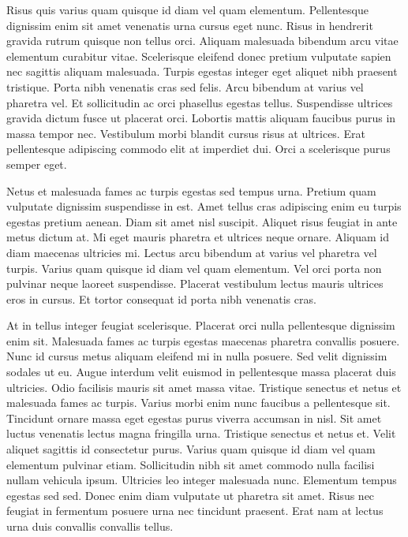 \documentclass[11pt,a4paper]{article}
\begin{document}
Risus quis varius quam quisque id diam vel quam elementum. Pellentesque dignissim enim sit amet venenatis urna cursus eget nunc. Risus in hendrerit gravida rutrum quisque non tellus orci. Aliquam malesuada bibendum arcu vitae elementum curabitur vitae. Scelerisque eleifend donec pretium vulputate sapien nec sagittis aliquam malesuada. Turpis egestas integer eget aliquet nibh praesent tristique. Porta nibh venenatis cras sed felis. Arcu bibendum at varius vel pharetra vel. Et sollicitudin ac orci phasellus egestas tellus. Suspendisse ultrices gravida dictum fusce ut placerat orci. Lobortis mattis aliquam faucibus purus in massa tempor nec. Vestibulum morbi blandit cursus risus at ultrices. Erat pellentesque adipiscing commodo elit at imperdiet dui. Orci a scelerisque purus semper eget.

Netus et malesuada fames ac turpis egestas sed tempus urna. Pretium quam vulputate dignissim suspendisse in est. Amet tellus cras adipiscing enim eu turpis egestas pretium aenean. Diam sit amet nisl suscipit. Aliquet risus feugiat in ante metus dictum at. Mi eget mauris pharetra et ultrices neque ornare. Aliquam id diam maecenas ultricies mi. Lectus arcu bibendum at varius vel pharetra vel turpis. Varius quam quisque id diam vel quam elementum. Vel orci porta non pulvinar neque laoreet suspendisse. Placerat vestibulum lectus mauris ultrices eros in cursus. Et tortor consequat id porta nibh venenatis cras.

At in tellus integer feugiat scelerisque. Placerat orci nulla pellentesque dignissim enim sit. Malesuada fames ac turpis egestas maecenas pharetra convallis posuere. Nunc id cursus metus aliquam eleifend mi in nulla posuere. Sed velit dignissim sodales ut eu. Augue interdum velit euismod in pellentesque massa placerat duis ultricies. Odio facilisis mauris sit amet massa vitae. Tristique senectus et netus et malesuada fames ac turpis. Varius morbi enim nunc faucibus a pellentesque sit. Tincidunt ornare massa eget egestas purus viverra accumsan in nisl. Sit amet luctus venenatis lectus magna fringilla urna. Tristique senectus et netus et. Velit aliquet sagittis id consectetur purus. Varius quam quisque id diam vel quam elementum pulvinar etiam. Sollicitudin nibh sit amet commodo nulla facilisi nullam vehicula ipsum. Ultricies leo integer malesuada nunc. Elementum tempus egestas sed sed. Donec enim diam vulputate ut pharetra sit amet. Risus nec feugiat in fermentum posuere urna nec tincidunt praesent. Erat nam at lectus urna duis convallis convallis tellus.
\end{document}
